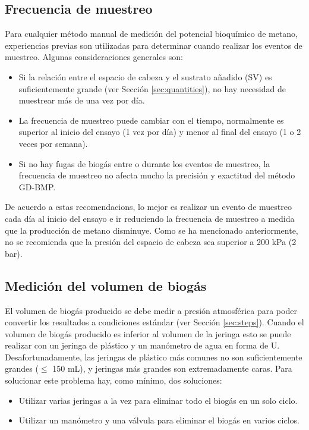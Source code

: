 \documentclass[]{article}
\begin{document}
\subsection{Frecuencia de muestreo}
\label{sec:freq}

Para cualquier método manual de medición del potencial bioquímico de metano, experiencias previas son utilizadas para determinar cuando realizar los eventos de muestreo.
Algunas consideraciones generales son:
\begin{itemize}
	\item Si la relación entre el espacio de cabeza y el sustrato añadido (SV) es suficientemente grande (ver Sección \ref{sec:quantities}), no hay necesidad de muestrear más de una vez por día.
  \item La frecuencia de muestreo puede cambiar con el tiempo, normalmente es superior al inicio del ensayo (1 vez por día) y menor al final del ensayo (1 o 2 veces por semana).
  \item Si no hay fugas de biogás entre o durante los eventos de muestreo, la frecuencia de muestreo no afecta mucho la precisión y exactitud del método GD-BMP.
\end{itemize}

De acuerdo a estas recomendacions, lo mejor es realizar un evento de muestreo cada día al inicio del ensayo e ir reduciendo la frecuencia de muestreo a medida que la producción de metano disminuye. Como se ha mencionado anteriormente, no se recomienda que la presión del espacio de cabeza sea superior a 200 kPa (2 bar).

\subsection{Medición del volumen de biogás}
\label{sec:volmeas}
El volumen de biogás producido se debe medir a presión atmosférica para poder convertir los resultados a condiciones estándar (ver Sección \ref{sec:steps}). Cuando el volumen de biogás producido es inferior al volumen de la jeringa esto se puede realizar con un jeringa de plástico y un manómetro de agua en forma de U. Desafortunadamente, las jeringas de plástico más comunes no son suficientemente grandes ($\le$ 150 mL), y jeringas más grandes son extremadamente caras. Para solucionar este problema hay, como mínimo, dos soluciones:
\begin{itemize}
  \item Utilizar varias jeringas a la vez para eliminar todo el biogás en un solo ciclo.
  \item Utilizar un manómetro y una válvula para eliminar el biogás en varios ciclos. 
\end{itemize}
\end{document}
